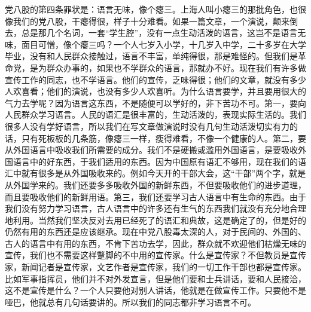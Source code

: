 党八股的第四条罪状是：语言无味，像个瘪三。上海人叫小瘪三的那批角色，也很像我们的党八股，干瘪得很，样子十分难看。如果一篇文章，一个演说，颠来倒去，总是那几个名词，一套“学生腔”，没有一点生动活泼的语言，这岂不是语言无味，面目可憎，像个瘪三吗？一个人七岁入小学，十几岁入中学，二十多岁在大学毕业，没有和人民群众接触过，语言不丰富，单纯得很，那是难怪的。但我们是革命党，是为群众办事的，如果也不学群众的语言，那就办不好。现在我们有许多做宣传工作的同志，也不学语言。他们的宣传，乏味得很；他们的文章，就没有多少人欢喜看；他们的演说，也没有多少人欢喜听。为什么语言要学，并且要用很大的气力去学呢？因为语言这东西，不是随便可以学好的，非下苦功不可。第一，要向人民群众学习语言。人民的语汇是很丰富的，生动活泼的，表现实际生活的。我们很多人没有学好语言，所以我们在写文章做演说时没有几句生动活泼切实有力的话，只有死板板的几条筋，像瘪三一样，瘦得难看，不像一个健康的人。第二，要从外国语言中吸收我们所需要的成分。我们不是硬搬或滥用外国语言，是要吸收外国语言中的好东西，于我们适用的东西。因为中国原有语汇不够用，现在我们的语汇中就有很多是从外国吸收来的。例如今天开的干部大会，这“干部”两个字，就是从外国学来的。我们还要多多吸收外国的新鲜东西，不但要吸收他们的进步道理，而且要吸收他们的新鲜用语。第三，我们还要学习古人语言中有生命的东西。由于我们没有努力学习语言，古人语言中的许多还有生气的东西我们就没有充分地合理地利用。当然我们坚决反对去用已经死了的语汇和典故，这是确定了的，但是好的仍然有用的东西还是应该继承。现在中党八股毒太深的人，对于民间的、外国的、古人的语言中有用的东西，不肯下苦功去学，因此，群众就不欢迎他们枯燥无味的宣传，我们也不需要这样蹩脚的不中用的宣传家。什么是宣传家？不但教员是宣传家，新闻记者是宣传家，文艺作者是宣传家，我们的一切工作干部也都是宣传家。比如军事指挥员，他们并不对外发宣言，但是他们要和士兵讲话，要和人民接洽，这不是宣传是什么？一个人只要他对别人讲话，他就是在做宣传工作。只要他不是哑巴，他就总有几句话要讲的。所以我们的同志都非学习语言不可。

